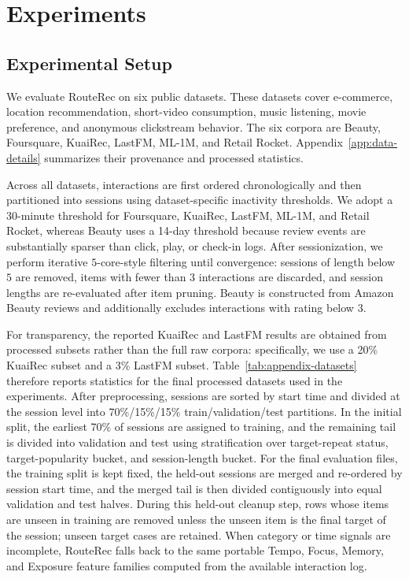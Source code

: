 \documentclass[sigconf,review,anonymous]{acmart}
\begin{document}
\section{Experiments}
\label{sec:experiments}


\subsection{Experimental Setup}
We evaluate RouteRec on six public datasets. These datasets cover e-commerce, location recommendation, short-video consumption, music listening, movie preference, and anonymous clickstream behavior. The six corpora are Beauty, Foursquare, KuaiRec, LastFM, ML-1M, and Retail Rocket. Appendix~\ref{app:data-details} summarizes their provenance and processed statistics.

Across all datasets, interactions are first ordered chronologically and then partitioned into sessions using dataset-specific inactivity thresholds. We adopt a 30-minute threshold for Foursquare, KuaiRec, LastFM, ML-1M, and Retail Rocket, whereas Beauty uses a 14-day threshold because review events are substantially sparser than click, play, or check-in logs. After sessionization, we perform iterative $5$-core-style filtering until convergence: sessions of length below $5$ are removed, items with fewer than $3$ interactions are discarded, and session lengths are re-evaluated after item pruning. Beauty is constructed from Amazon Beauty reviews and additionally excludes interactions with rating below $3$.

For transparency, the reported KuaiRec and LastFM results are obtained from processed subsets rather than the full raw corpora: specifically, we use a 20\% KuaiRec subset and a 3\% LastFM subset. Table~\ref{tab:appendix-datasets} therefore reports statistics for the final processed datasets used in the experiments. After preprocessing, sessions are sorted by start time and divided at the session level into 70\%/15\%/15\% train/validation/test partitions. In the initial split, the earliest 70\% of sessions are assigned to training, and the remaining tail is divided into validation and test using stratification over target-repeat status, target-popularity bucket, and session-length bucket. For the final evaluation files, the training split is kept fixed, the held-out sessions are merged and re-ordered by session start time, and the merged tail is then divided contiguously into equal validation and test halves. During this held-out cleanup step, rows whose items are unseen in training are removed unless the unseen item is the final target of the session; unseen target cases are retained. When category or time signals are incomplete, RouteRec falls back to the same portable Tempo, Focus, Memory, and Exposure feature families computed from the available interaction log.
\end{document}
